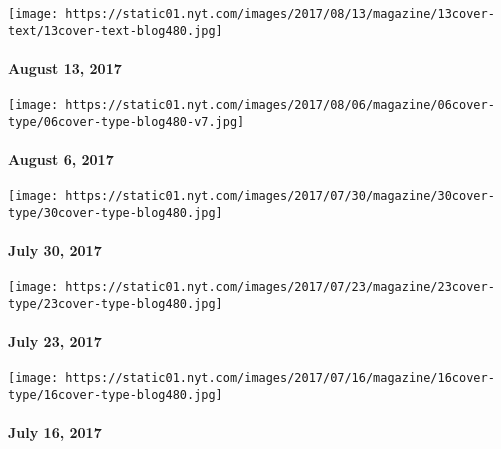 \href{https://www.nytimes.com/issue/magazine/2017/08/10/the-81317-issue}{}

\texttt{[image: https://static01.nyt.com/images/2017/08/13/magazine/13cover-text/13cover-text-blog480.jpg]}

\hypertarget{august-13-2017}{%
\paragraph{August 13, 2017}\label{august-13-2017}}

\href{https://www.nytimes.com/issue/magazine/2017/08/04/magazine-index}{}

\texttt{[image: https://static01.nyt.com/images/2017/08/06/magazine/06cover-type/06cover-type-blog480-v7.jpg]}

\hypertarget{august-6-2017}{%
\paragraph{August 6, 2017}\label{august-6-2017}}

\href{https://www.nytimes.com/issue/magazine/2017/07/28/magazine-index}{}

\texttt{[image: https://static01.nyt.com/images/2017/07/30/magazine/30cover-type/30cover-type-blog480.jpg]}

\hypertarget{july-30-2017}{%
\paragraph{July 30, 2017}\label{july-30-2017}}

\href{https://www.nytimes.com/issue/magazine/2017/07/21/magazine-index-20170723}{}

\texttt{[image: https://static01.nyt.com/images/2017/07/23/magazine/23cover-type/23cover-type-blog480.jpg]}

\hypertarget{july-23-2017}{%
\paragraph{July 23, 2017}\label{july-23-2017}}

\href{https://www.nytimes.com/issue/magazine/2017/07/14/magazine-index-20170716}{}

\texttt{[image: https://static01.nyt.com/images/2017/07/16/magazine/16cover-type/16cover-type-blog480.jpg]}

\hypertarget{july-16-2017}{%
\paragraph{July 16, 2017}\label{july-16-2017}}

